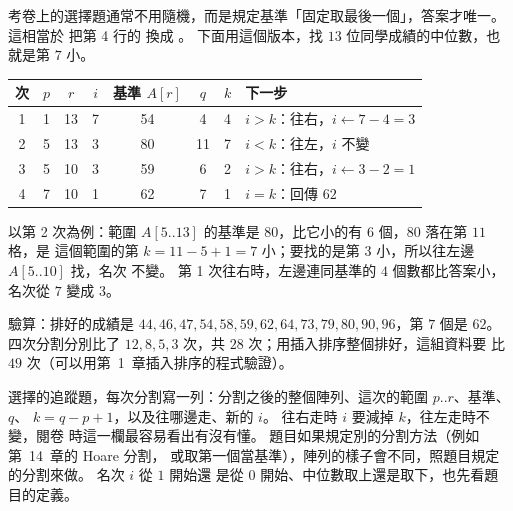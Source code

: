 考卷上的選擇題通常不用隨機，而是規定基準「固定取最後一個」，答案才唯一。 這相當於
把第 4 行的  換成 。 下面用這個版本，找
$13$ 位同學成績的中位數，也就是第 $7$ 小。

\begin{center}
\label{fig:sel-score-trace}
\end{center}

\begin{center}
\begin{tabular}{cccccccl}
\toprule
次 & $p$ & $r$ & $i$ & 基準 $A[r]$ & $q$ & $k$ & 下一步 \\
\midrule
1 & 1 & 13 & 7 & 54 & 4 & 4 & $i > k$：往右，$i \gets 7 - 4 = 3$ \\
2 & 5 & 13 & 3 & 80 & 11 & 7 & $i < k$：往左，$i$ 不變 \\
3 & 5 & 10 & 3 & 59 & 6 & 2 & $i > k$：往右，$i \gets 3 - 2 = 1$ \\
4 & 7 & 10 & 1 & 62 & 7 & 1 & $i = k$：回傳 $62$ \\
\bottomrule
\end{tabular}
\end{center}

以第 2 次為例：範圍 $A[5..13]$ 的基準是 $80$，比它小的有 $6$ 個，$80$ 落在第 $11$ 格，是
這個範圍的第 $k = 11 - 5 + 1 = 7$ 小；要找的是第 $3$ 小，所以往左邊 $A[5..10]$ 找，名次
不變。 第 1 次往右時，左邊連同基準的 $4$ 個數都比答案小，名次從 $7$ 變成 $3$。

驗算：排好的成績是 $44, 46, 47, 54, 58, 59, 62, 64, 73, 79, 80, 90, 96$，第 $7$ 個是
$62$。 四次分割分別比了 $12, 8, 5, 3$ 次，共 $28$ 次；用插入排序整個排好，這組資料要
比 $49$ 次（可以用第~1~章插入排序的程式驗證）。

\begin{examnote}
選擇的追蹤題，每次分割寫一列：分割之後的整個陣列、這次的範圍 $p..r$、基準、$q$、
$k = q - p + 1$，以及往哪邊走、新的 $i$。 往右走時 $i$ 要減掉 $k$，往左走時不變，閱卷
時這一欄最容易看出有沒有懂。 題目如果規定別的分割方法（例如第~14~章的 Hoare 分割，
或取第一個當基準），陣列的樣子會不同，照題目規定的分割來做。 名次 $i$ 從 $1$ 開始還
是從 $0$ 開始、中位數取上還是取下，也先看題目的定義。
\end{examnote}

